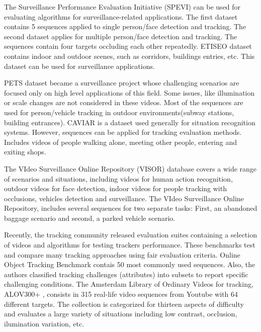 The Surveillance Performance Evaluation Initiative (SPEVI) \cite{Maggio2005}
can be used for evaluating algorithms for surveillance-related applications. The
first dataset contains 5 sequences applied to single person/face detection and
tracking. The second dataset applies for multiple person/face detection and
tracking. The sequences contain four targets occluding each other repeatedly.
ETISEO dataset \cite{Munder2006} contains indoor and outdoor scenes, such as
corridors, buildings entries, etc. This dataset can be used for surveillance
applications.

PETS dataset \cite{PETS} became a surveillance project whose challenging
scenarios are focused only on high level applications of this field. Some
issues, like illumination or scale changes are not considered in these videos.
Most of the sequences are used for person/vehicle tracking in outdoor
environments(subway stations, building entrances). CAVIAR \cite{Torralba2003}
is a dataset used generally for situation recognition systems. However,
sequences can be applied for tracking evaluation methods. Includes videos of
people walking alone, meeting other people, entering and exiting shops.

The VIdeo Surveillance Online Repository (VISOR) \cite{Vezzani2010} database
covers a wide range of scenarios and situations, including videos for human
action recognition, outdoor videos for face detection, indoor videos for people
tracking with occlusions, vehicles detection and surveillance. The VIdeo
Surveillance Online Repository, includes several sequences for two separate
tasks: First, an abandoned baggage scenario and second, a parked vehicle
scenario.

Recently, the tracking community released evaluation suites containing a
selection of videos and algorithms for testing trackers performance. These
benchmarks test and compare many tracking approaches using fair evaluation
criteria. Online Object Tracking Benchmark \cite{Wu2013B} contais 50 most
commonly used sequences. Also, the authors classified tracking challenges
(attributes) into subsets to report specific challenging conditions. The
Amsterdam Library of Ordinary Videos for tracking, ALOV300+ \cite{Smeulders2014},
consists in 315 real-life video sequences from Youtube with 64 different
targets. The collection is categorized for thirteen aspects of difficulty and
evaluates a large variety of situations including low contrast, occlusion,
ilumination variation, etc.

